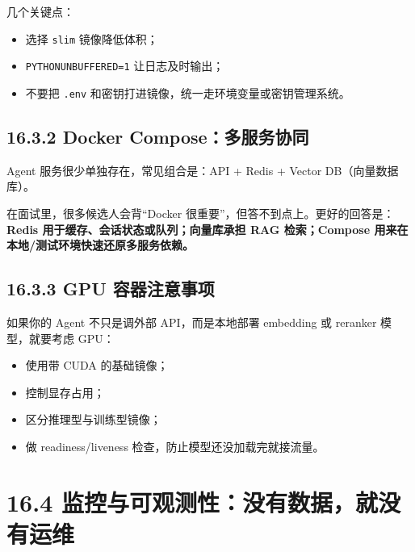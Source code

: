 几个关键点：


\begin{itemize}[leftmargin=2em]
\item 选择 \texttt{slim} 镜像降低体积；
\item \texttt{PYTHONUNBUFFERED=1} 让日志及时输出；
\item 不要把 \texttt{.env} 和密钥打进镜像，统一走环境变量或密钥管理系统。
\end{itemize}

\subsection{16.3.2 Docker Compose：多服务协同}

Agent 服务很少单独存在，常见组合是：API + Redis + Vector DB（向量数据库）。



在面试里，很多候选人会背``Docker 很重要''，但答不到点上。更好的回答是：\textbf{Redis 用于缓存、会话状态或队列；向量库承担 RAG 检索；Compose 用来在本地/测试环境快速还原多服务依赖。}


\subsection{16.3.3 GPU 容器注意事项}

如果你的 Agent 不只是调外部 API，而是本地部署 embedding 或 reranker 模型，就要考虑 GPU：


\begin{itemize}[leftmargin=2em]
\item 使用带 CUDA 的基础镜像；
\item 控制显存占用；
\item 区分推理型与训练型镜像；
\item 做 readiness/liveness 检查，防止模型还没加载完就接流量。
\end{itemize}

\section{16.4 监控与可观测性：没有数据，就没有运维}

